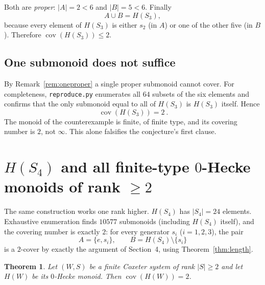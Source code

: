 \documentclass[11pt]{article}
\newtheorem{theorem}{Theorem}
\theoremstyle{definition}
\theoremstyle{remark}
\newcommand{\cov}{\operatorname{cov}}
\begin{document}
Both are \emph{proper}: $|A|=2<6$ and $|B|=5<6$. Finally
\[
A\cup B=H(S_3),
\]
because every element of $H(S_3)$ is either $s_2$ (in $A$) or one of the other
five (in $B$). Therefore $\cov(H(S_3))\le 2$.

\subsection{One submonoid does not suffice}

By Remark~\ref{rem:oneproper} a single proper submonoid cannot cover. For
completeness, \texttt{reproduce.py} enumerates all $64$ subsets of the six
elements and confirms that the only submonoid equal to all of $H(S_3)$ is
$H(S_3)$ itself. Hence
\[
\boxed{\ \cov(H(S_3))=2\ }.
\]
The monoid of the counterexample is finite, of finite type, and its covering
number is $2$, not $\infty$. This alone falsifies the conjecture's first
clause.

\section{$H(S_4)$ and all finite-type $0$-Hecke monoids of rank $\ge 2$}

The same construction works one rank higher. $H(S_4)$ has
$|S_4|=24$ elements. Exhaustive enumeration finds $10577$ submonoids
(including $H(S_4)$ itself), and the covering number is exactly $2$: for every
generator $s_i$ ($i=1,2,3$), the pair
\[
A=\{e,s_i\},\qquad B=H(S_4)\setminus\{s_i\}
\]
is a $2$-cover by exactly the argument of Section~4, using
Theorem~\ref{thm:length}.

\begin{theorem}\label{thm:general}
Let $(W,S)$ be a finite Coxeter system of rank $|S|\ge 2$ and let $H(W)$ be its
$0$-Hecke monoid. Then $\cov(H(W))=2$.
\end{theorem}
\end{document}
